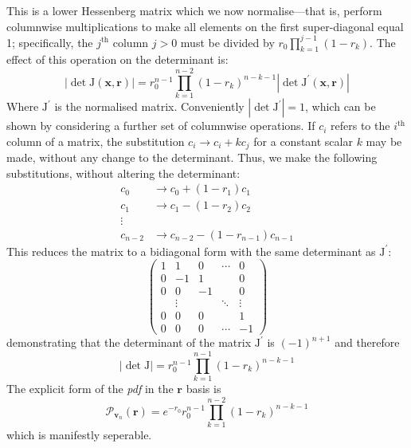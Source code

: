 \documentclass[aps,prl,twocolumn,floatfix]{revtex4}
\renewcommand{\vec}[1]{\mathbf{#1}}
\newcommand{\mat}[1]{\mathrm{#1}}
\newcommand{\of}[1]{\!\left(#1\right)}
\newcommand{\pdf}{{\it pdf}}
\newcommand{\abs}[1]{\left|#1\right|}
\newcommand{\prob}[1]{\mathcal{#1}}
\begin{document}
This is a lower Hessenberg matrix which we now normalise---that is, perform
columnwise multiplications to make all elements on the first super-diagonal
equal 1;
specifically, the \(j^{\text{th}}\) column \( j>0 \) must be divided by \( r_0
\prod_{k=1}^{j-1} \left( 1-r_k \right) \). The effect of this operation on the
determinant is:
\begin{equation}
  \abs{ \det \mat{J} \of{ \vec{x}, \vec{r} }} = r_0^{n-1} \prod_{k=1}^{n-2}
  \left( 1-r_k \right)^{n-k-1} \abs{ \det \mat{J}^{\prime} \of{ \vec{x}, \vec{r}
  } }
\end{equation}
Where \( \mat{J}^{\prime} \) is the normalised matrix. Conveniently \( \abs{
\det \mat{J}^{\prime} }=1 \), which can be shown by considering a further set of
columnwise operations. If \( c_i \) refers to the \( i^{\text{th}} \) column of
a matrix, the substitution \( c_i \rightarrow c_i + k c_j \) for a constant
scalar \(k\) may be made, without any change to the determinant. Thus, we make
the following substitutions, without altering the determinant:
\begin{align*}
  c_0 &\rightarrow c_0 + \left( 1-r_1 \right) c_1 \\
  c_1 &\rightarrow c_1 - \left( 1-r_2 \right) c_2 \\
  \vdots \\
  c_{n-2} &\rightarrow c_{n-2} - \left( 1-r_{n-1} \right) c_{n-1}
\end{align*}
This reduces the matrix to a bidiagonal form with the same determinant as \(
\mat{J}^{\prime} \):
\begin{equation*}
  \begin{pmatrix}
    1 & 1 & 0 & \cdots & 0 \\
    0 & -1 & 1 & & 0 \\
    0 & 0 & -1 & & 0 \\
    & \vdots & & \ddots & \vdots \\
    0 & 0 & 0 & & 1 \\
    0 & 0 & 0 & \cdots & -1 
  \end{pmatrix}
\end{equation*}
demonstrating that the determinant of the matrix \( \mat{J}^{\prime} \) is \(
\left( -1 \right)^{n+1} \) and therefore
\begin{equation}
  \abs{ \det \mat{J} } = r_0^{n-1} \prod_{k=1}^{n-1} \left( 1-r_k
  \right)^{n-k-1}
\end{equation}
The explicit form of the \pdf{} in the \(\vec{r}\) basis is
\begin{equation}
  \prob{P}_{\vec{v}_n} \of{ \vec{r} } = e^{-r_0} r_0^{n-1} \prod_{k=1}^{n-2}
  \left( 1-r_k \right)^{n-k-1}
\end{equation}
which is manifestly seperable.
\end{document}
